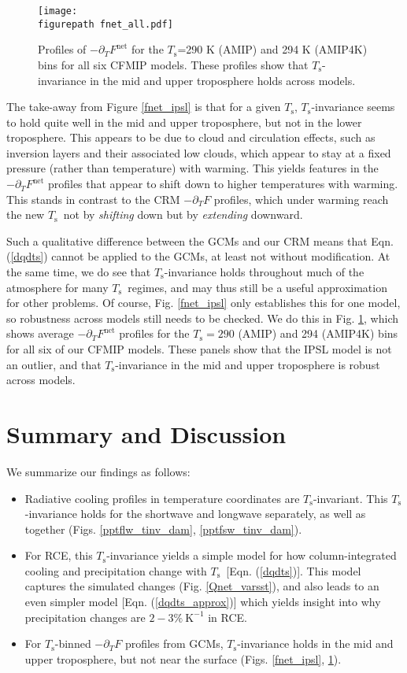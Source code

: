 \documentclass[10pt]{article}
\newcommand{\eqnref}[1]{(\ref{#1})}
\newcommand{\ppt}{\ensuremath{\partial_T}}
\newcommand{\Fnet}{\ensuremath{F^\mathrm{net}}}
\newcommand{\Ts}{\ensuremath{T_\mathrm{s}}}
\newcommand{\Kinverse}{\ensuremath{\mathrm{K^{-1}}}}
\newcommand{\figurepath}{../figures/}
\begin{document}
\begin{figure}[t]
	\begin{center}
			\texttt{[image: \\figurepath fnet\_all.pdf]}
		\caption{ Profiles of $-\ppt \Fnet$ for the \Ts=290 K (AMIP) and 294 K (AMIP4K) bins for all six CFMIP models. These profiles show that \Ts-invariance in the mid and upper troposphere holds across models.
		\label{fnet_all}
		}
	\end{center}
\end{figure}


The take-away from Figure \ref{fnet_ipsl} is that for a given \Ts, \Ts-invariance seems to hold quite well in the mid and upper troposphere, but not in the lower troposphere. This appears to be due to cloud and circulation  effects, such as inversion layers and their associated low clouds, which appear to stay at a fixed pressure (rather than temperature) with warming. This yields features in the $-\ppt \Fnet$ profiles that appear to shift down to higher temperatures with  warming. This stands in contrast to the CRM $-\ppt F$ profiles, which under warming reach the new \Ts\ not by \emph{shifting} down but by \emph{extending} downward. 

Such a qualitative difference between the GCMs and our CRM means that Eqn. \eqnref{dqdts} cannot be applied to the GCMs, at least not without modification. At the same time, we do see that \Ts-invariance holds throughout much of the atmosphere for many \Ts\ regimes, and may thus still be a useful approximation for other problems. Of course, Fig. \ref{fnet_ipsl} only establishes this for one model, so robustness across models still needs to be checked. We do this in Fig. \ref{fnet_all}, which shows average $-\ppt \Fnet$ profiles for the $\Ts= 290$ (AMIP) and 294 (AMIP4K) bins  for all six of our  CFMIP models. These panels show that the IPSL model is not an outlier, and that \Ts-invariance in the mid and upper troposphere is robust across models.



\section{Summary and Discussion}
We summarize our findings as follows:
	\begin{itemize}
		\item Radiative cooling profiles in temperature coordinates are  \Ts-invariant. This \Ts-invariance holds for the shortwave and longwave separately, as well as together (Figs. \ref{pptflw_tinv_dam}, \ref{pptfsw_tinv_dam}).
		\item For RCE, this \Ts-invariance yields a simple model for how column-integrated cooling and  precipitation change with \Ts\ [Eqn. \eqnref{dqdts}]. This model captures the simulated changes (Fig. \ref{Qnet_varsst}), and also leads to an even simpler model [Eqn. \eqnref{dqdts_approx}] which yields insight into why precipitation changes are  $2 -3\%\ \Kinverse$ in RCE.
		\item For \Ts-binned $-\ppt F$ profiles from GCMs, \Ts-invariance holds in the mid and upper troposphere, but not near the surface (Figs. \ref{fnet_ipsl}, \ref{fnet_all}).
	\end{itemize}
		
\end{document}
